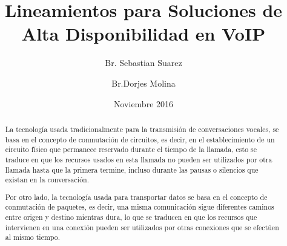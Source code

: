 \documentclass[12pt]{article}
\title{Lineamientos para Soluciones de Alta Disponibilidad en VoIP}
\author{Br. Sebastian Suarez \and
		Br.Dorjes Molina}
\date{Noviembre 2016}
\begin{document}
	\maketitle
	\newpage
	\begin{abstract}
		\item
		La tecnolog\'ia usada tradicionalmente para la transmisi\'on de conversaciones vocales, se basa en el concepto de conmutaci\'on de circuitos, es decir, en el establecimiento de un circuito f\'isico que permanece reservado durante el tiempo de la llamada, esto se traduce en que los recursos usados en esta llamada no pueden ser utilizados por otra llamada hasta que la primera termine, incluso durante las pausas o silencios que existan en la conversaci\'on.
		
		Por otro lado, la tecnolog\'ia usada para transportar datos se basa en el concepto de conmutaci\'on de paquetes, es decir, una misma comunicaci\'on sigue diferentes caminos entre origen y destino mientras dura, lo que se traducen en que los recursos que intervienen en una conexi\'on pueden ser utilizados por otras conexiones que se efect\'uen al mismo tiempo.
		
	\end{abstract}
\end{document}
